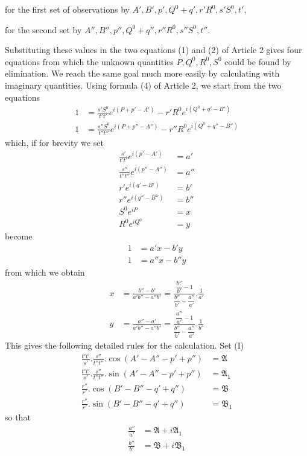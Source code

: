 for the first set of observations by $A',B',p',Q^0+q',r'R^0,s'S^0,t'$,

for the second set by $A'',B'',p'',Q^0+q'',r''R^0,s''S^0,t''$.

Substituting these values in the two equations (1) and (2) of Article 2 gives four equations from which the unknown quantities $P,Q^0,R^0,S^0$ could be found by elimination. We reach the same goal much more easily by calculating with imaginary quantities. Using formula (4) of Article 2, we start from the two equations
\[
\begin{aligned}
1&=\frac{s'S^0}{t't'}e^{i(P+p'-A')}-r'R^0e^{i(Q^0+q'-B')}\\
1&=\frac{s''S^0}{t''t''}e^{i(P+p''-A'')}-r''R^0e^{i(Q^0+q''-B'')}
\end{aligned}
\]
which, if for brevity we set
\[
\begin{aligned}
\frac{s'}{t't'}e^{i(p'-A')}&=a'\\
\frac{s''}{t''t''}e^{i(p''-A'')}&=a''\\
r'e^{i(q'-B')}&=b'\\
r''e^{i(q''-B'')}&=b''\\
S^0e^{iP}&=x\\
R^0e^{iQ^0}&=y
\end{aligned}
\]
become
\[
\begin{aligned}
1&=a'x-b'y\\
1&=a''x-b''y
\end{aligned}
\]
from which we obtain
\[
\begin{aligned}
x&=\frac{b''-b'}{a'b''-a''b'}=\frac{\dfrac{b''}{b'}-1}{\dfrac{b''}{b'}-\dfrac{a''}{a'}}.\frac{1}{a'}\\[1ex]
y&=\frac{a''-a'}{a'b''-a''b'}=\frac{\dfrac{a''}{a'}-1}{\dfrac{b''}{b'}-\dfrac{a''}{a'}}.\frac{1}{b'}
\end{aligned}
\]
This gives the following detailed rules for the calculation. Set (I)
\[
\begin{aligned}
\frac{t't'}{s'}.\frac{s''}{t''t''}.\cos(A'-A''-p'+p'')&=\mathfrak{A}\\
\frac{t't'}{s'}.\frac{s''}{t''t''}.\sin(A'-A''-p'+p'')&=\mathfrak{A}_1\\
\frac{r''}{r'}.\cos(B'-B''-q'+q'')&=\mathfrak{B}\\
\frac{r''}{r'}.\sin(B'-B''-q'+q'')&=\mathfrak{B}_1
\end{aligned}
\]
so that
\[
\begin{aligned}
\frac{a''}{a'}&=\mathfrak{A}+i\mathfrak{A}_1\\
\frac{b''}{b'}&=\mathfrak{B}+i\mathfrak{B}_1
\end{aligned}
\]
